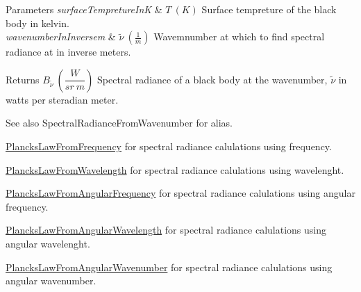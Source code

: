 \begin{DoxyParams}{Parameters}
{\em surface\+Tempreture\+InK} & $T\ (K)$ Surface tempreture of the black body in kelvin. \\
\hline
{\em wavenumber\+In\+Inversem} & $\tilde {\nu }\ (\frac{1}{m})$ Wavemnumber at which to find spectral radiance at in inverse meters. \\
\hline
\end{DoxyParams}
\begin{DoxyReturn}{Returns}
$B_{\tilde {\nu }}\ ( \dfrac{W}{sr\ m})$ Spectral radiance of a black body at the wavenumber, $\tilde {\nu }$ in watts per steradian meter. 
\end{DoxyReturn}
\begin{DoxySeeAlso}{See also}
Spectral\+Radiance\+From\+Wavenumber for alias. 

\mbox{\hyperlink{group___e_g_x_phys-_electrodynamics-_black_body-_plancks_law_ga68aae82f8a086831358c4a61c8c80ba4}{Plancks\+Law\+From\+Frequency}} for spectral radiance calulations using frequency. 

\mbox{\hyperlink{group___e_g_x_phys-_electrodynamics-_black_body-_plancks_law_ga54639bc031ded51ef78aa82b0457a4dd}{Plancks\+Law\+From\+Wavelength}} for spectral radiance calulations using wavelenght. 

\mbox{\hyperlink{group___e_g_x_phys-_electrodynamics-_black_body-_plancks_law_gaac540560c71e30c02b91d22e417b5863}{Plancks\+Law\+From\+Angular\+Frequency}} for spectral radiance calulations using angular frequency. 

\mbox{\hyperlink{group___e_g_x_phys-_electrodynamics-_black_body-_plancks_law_ga7322124727f968d28807e918c5eeb23f}{Plancks\+Law\+From\+Angular\+Wavelength}} for spectral radiance calulations using angular wavelenght. 

\mbox{\hyperlink{group___e_g_x_phys-_electrodynamics-_black_body-_plancks_law_gaa3d3e0fdb77d25bdd40523f9975de902}{Plancks\+Law\+From\+Angular\+Wavenumber}} for spectral radiance calulations using angular wavenumber. 
\end{DoxySeeAlso}

